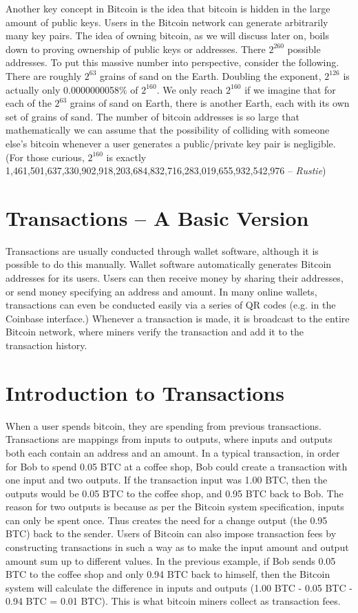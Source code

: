 \documentclass[11pt]{article}
\begin{document}
    Another key concept in Bitcoin is the idea that bitcoin is hidden in the large amount of public keys. Users in the Bitcoin network can generate arbitrarily many key pairs. The idea of owning bitcoin, as we will discuss later on, boils down to proving ownership of public keys or addresses. There $2^{260}$ possible addresses. To put this massive number into perspective, consider the following. There are roughly $2^{63}$ grains of sand on the Earth. Doubling the exponent, $2^{126}$ is actually only 0.0000000058\% of $2^{160}$. We only reach $2^{160}$ if we imagine that for each of the $2^{63}$ grains of sand on Earth, there is another Earth, each with its own set of grains of sand. The number of bitcoin addresses is so large that mathematically we can assume that the possibility of colliding with someone else's bitcoin whenever a user generates a public/private key pair is negligible. (For those curious, $2^{160}$ is exactly 1,461,501,637,330,902,918,203,684,832,716,283,019,655,932,542,976 -- \textit{Rustie}) 
    
    \section*{Transactions -- A Basic Version}
    
    Transactions are usually conducted through wallet software, although it is possible to do this manually. Wallet software automatically generates Bitcoin addresses for its users. Users can then receive money by sharing their addresses, or send money specifying an address and amount. In many online wallets, transactions can even be conducted easily via a series of QR codes (e.g. in the Coinbase interface.) Whenever a transaction is made, it is broadcast to the entire Bitcoin network, where miners verify the transaction and add it to the transaction history.
    
    \section*{Introduction to Transactions}
    
    When a user spends bitcoin, they are spending from previous transactions. Transactions are mappings from inputs to outputs, where inputs and outputs both each contain an address and an amount. In a typical transaction, in order for Bob to spend 0.05 BTC at a coffee shop, Bob could create a transaction with one input and two outputs. If the transaction input was 1.00 BTC, then the outputs would be 0.05 BTC to the coffee shop, and 0.95 BTC back to Bob. The reason for two outputs is because as per the Bitcoin system specification, inputs can only be spent once. Thus creates the need for a change output (the 0.95 BTC) back to the sender. Users of Bitcoin can also impose transaction fees by constructing transactions in such a way as to make the input amount and output amount sum up to different values. In the previous example, if Bob sends 0.05 BTC to the coffee shop and only 0.94 BTC back to himself, then the Bitcoin system will calculate the difference in inputs and outputs (1.00 BTC - 0.05 BTC - 0.94 BTC = 0.01 BTC). This is what bitcoin miners collect as transaction fees. 
\end{document}

